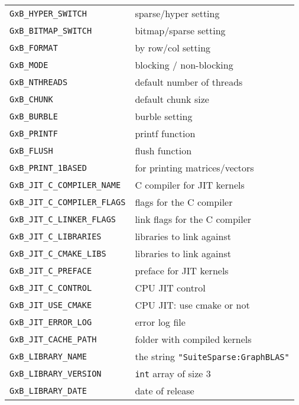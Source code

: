 \documentclass[12pt]{article}
\begin{document}
\vspace{0.2in}
{\footnotesize
\begin{tabular}{ll}
        \hline
        \verb'GxB_HYPER_SWITCH'         & sparse/hyper setting \\
        \verb'GxB_BITMAP_SWITCH'        & bitmap/sparse setting \\
        \verb'GxB_FORMAT'               & by row/col setting \\
        \verb'GxB_MODE'                 & blocking / non-blocking \\
        \verb'GxB_NTHREADS'             & default number of threads \\
        \verb'GxB_CHUNK'                & default chunk size \\
        \verb'GxB_BURBLE'       & burble setting \\
        \verb'GxB_PRINTF'       & printf function \\
        \verb'GxB_FLUSH'        & flush function \\
        \verb'GxB_PRINT_1BASED' & for printing matrices/vectors \\
        \hline
        \verb'GxB_JIT_C_COMPILER_NAME'  & C compiler for JIT kernels \\
        \verb'GxB_JIT_C_COMPILER_FLAGS' & flags for the C compiler \\
        \verb'GxB_JIT_C_LINKER_FLAGS'   & link flags for the C compiler \\
        \verb'GxB_JIT_C_LIBRARIES'      & libraries to link against \\
        \verb'GxB_JIT_C_CMAKE_LIBS'     & libraries to link against \\
        \verb'GxB_JIT_C_PREFACE'        & preface for JIT kernels \\
        \verb'GxB_JIT_C_CONTROL'        & CPU JIT control \\
        \verb'GxB_JIT_USE_CMAKE'        & CPU JIT: use cmake or not \\ 
        \verb'GxB_JIT_ERROR_LOG'        & error log file \\
        \verb'GxB_JIT_CACHE_PATH'       & folder with compiled kernels \\
        \hline
        \verb'GxB_LIBRARY_NAME'         & the string
                                        \verb'"SuiteSparse:GraphBLAS"' \\
        \verb'GxB_LIBRARY_VERSION'      & \verb'int' array of size 3 \\
        \verb'GxB_LIBRARY_DATE'         & date of release \\

\end{tabular}}
\end{document}
